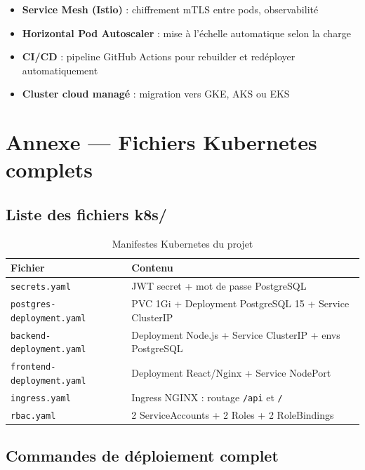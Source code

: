 \documentclass[12pt,a4paper]{article}
\begin{document}
\begin{itemize}
  \item \textbf{Service Mesh (Istio)} : chiffrement mTLS entre pods, observabilité
  \item \textbf{Horizontal Pod Autoscaler} : mise à l'échelle automatique selon la charge
  \item \textbf{CI/CD} : pipeline GitHub Actions pour rebuilder et redéployer automatiquement
  \item \textbf{Cluster cloud managé} : migration vers GKE, AKS ou EKS
\end{itemize}

\appendix
\section{Annexe — Fichiers Kubernetes complets}

\subsection{Liste des fichiers k8s/}

\begin{table}[H]
  \centering
  \begin{tabularx}{\textwidth}{lX}
    \toprule
    \textbf{Fichier} & \textbf{Contenu} \\
    \midrule
    \texttt{secrets.yaml}             & JWT secret + mot de passe PostgreSQL \\
    \texttt{postgres-deployment.yaml} & PVC 1Gi + Deployment PostgreSQL 15 + Service ClusterIP \\
    \texttt{backend-deployment.yaml}  & Deployment Node.js + Service ClusterIP + envs PostgreSQL \\
    \texttt{frontend-deployment.yaml} & Deployment React/Nginx + Service NodePort \\
    \texttt{ingress.yaml}             & Ingress NGINX : routage \texttt{/api} et \texttt{/} \\
    \texttt{rbac.yaml}                & 2 ServiceAccounts + 2 Roles + 2 RoleBindings \\
    \bottomrule
  \end{tabularx}
  \caption{Manifestes Kubernetes du projet}
\end{table}

\subsection{Commandes de déploiement complet}
\end{document}
